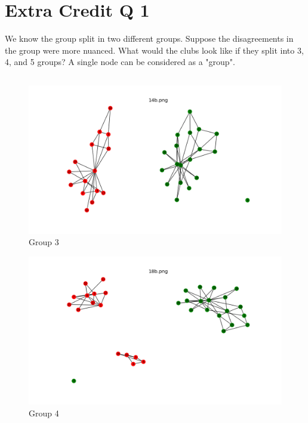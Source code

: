 \documentclass[12pt]{article}
\begin{document}
\section*{Extra Credit Q 1}
We know the group split in two different groups. Suppose the disagreements in the group were more nuanced. What would the clubs look like if they split into 3, 4, and 5 groups? A single node can be considered as a "group".
\subsection*{\color{blue}{Answer}}
\begin{figure}[H]
\centering
\includegraphics[trim=0 0 0 0, clip, width=\textwidth] {14b.png}
\caption{Group 3}
\label{fig:q3}
\end{figure}
\begin{figure}[H]
\centering
\includegraphics[trim=0 0 0 0, clip, width=\textwidth] {18b.png}
\caption{Group 4 }
\label{fig:q4}
\end{figure}
\end{document}

